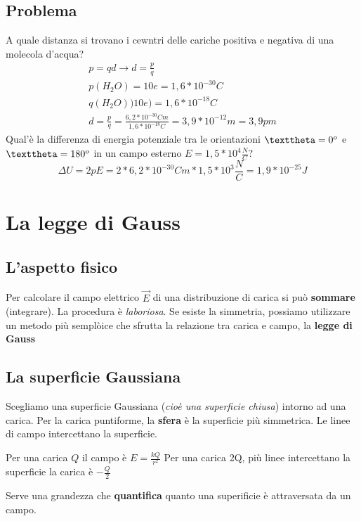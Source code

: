 \documentclass{book}
\begin{document}
\section{Problema}
\begin{tasks}
  \task A quale distanza si trovano i cewntri delle cariche positiva e negativa di una molecola d'acqua?
  \begin{eqnarray*}
    p=qd\to d=\frac{p}{q}\\
    p(H_2O)=10e=1,6*10^{-30}C\\
    q(H_2O))10e)=1,6*10^{-18}C\\
    d=\frac{p}{q}=\frac{6,2*10^{-30}Cm}{1,6*10^{-18}C}=3,9*10^{-12}m=3,9pm
  \end{eqnarray*}
  \task Qual'è la differenza di energia potenziale tra le orientazioni $\texttheta=0^o$ e $\texttheta=180^o$ in un campo esterno $E=1,5*10^4\frac{N}{C}$?
  \begin{equation}
	\Delta U=2pE=2*6,2*10^{-30}Cm*1,5*10^3\frac{N}{C}=1,9*10^{-25}J
  \end{equation}
\end{tasks}
\chapter{La legge di Gauss}
\section{L'aspetto fisico}
Per calcolare il campo elettrico $\vec{E}$ di una distribuzione di carica si può \textbf{sommare} (integrare). La procedura è \textit{laboriosa}. Se esiste la simmetria, possiamo utilizzare un metodo più semplòice che sfrutta la relazione tra carica e campo, la \textbf{legge di Gauss}
\section{La superficie Gaussiana}
Scegliamo una superficie Gaussiana ({\it cioè una superficie chiusa}) intorno ad una carica.
Per la carica puntiforme, la {\bf sfera} è la superficie più simmetrica.
Le linee di campo intercettano la superficie.
\begin{tasks}
  \task Per una carica $Q$ il campo è $E=\frac{kQ}{r^2}$
  \task Per una carica 2Q, più linee intercettano la superficie
  \task la carica è $-\frac{Q}{2}$
\end{tasks}
Serve una grandezza che \textbf{quantifica} quanto una superificie è attraversata da un campo.
\end{document}
